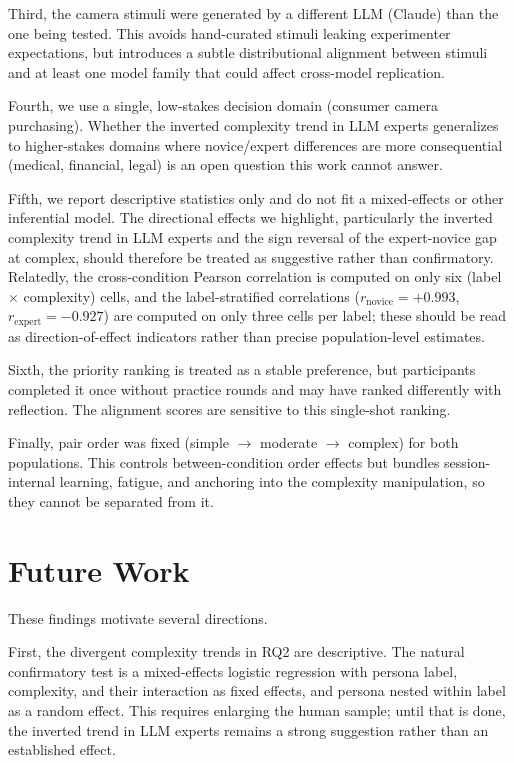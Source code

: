 \documentclass{sigchi-ext}
\begin{document}
Third, the camera stimuli were generated by a different LLM (Claude) than the one being tested. This avoids hand-curated stimuli leaking experimenter expectations, but introduces a subtle distributional alignment between stimuli and at least one model family that could affect cross-model replication.

Fourth, we use a single, low-stakes decision domain (consumer camera purchasing). Whether the inverted complexity trend in LLM experts generalizes to higher-stakes domains where novice/expert differences are more consequential (medical, financial, legal) is an open question this work cannot answer.

Fifth, we report descriptive statistics only and do not fit a mixed-effects or other inferential model. The directional effects we highlight, particularly the inverted complexity trend in LLM experts and the sign reversal of the expert-novice gap at complex, should therefore be treated as suggestive rather than confirmatory. Relatedly, the cross-condition Pearson correlation is computed on only six (label $\times$ complexity) cells, and the label-stratified correlations ($r_{\text{novice}} = +0.993$, $r_{\text{expert}} = -0.927$) are computed on only three cells per label; these should be read as direction-of-effect indicators rather than precise population-level estimates.

Sixth, the priority ranking is treated as a stable preference, but participants completed it once without practice rounds and may have ranked differently with reflection. The alignment scores are sensitive to this single-shot ranking.

Finally, pair order was fixed (simple $\rightarrow$ moderate $\rightarrow$ complex) for both populations. This controls between-condition order effects but bundles session-internal learning, fatigue, and anchoring into the complexity manipulation, so they cannot be separated from it.

\section{Future Work}
These findings motivate several directions.

First, the divergent complexity trends in RQ2 are descriptive. The natural confirmatory test is a mixed-effects logistic regression with persona label, complexity, and their interaction as fixed effects, and persona nested within label as a random effect. This requires enlarging the human sample; until that is done, the inverted trend in LLM experts remains a strong suggestion rather than an established effect.
\end{document}
